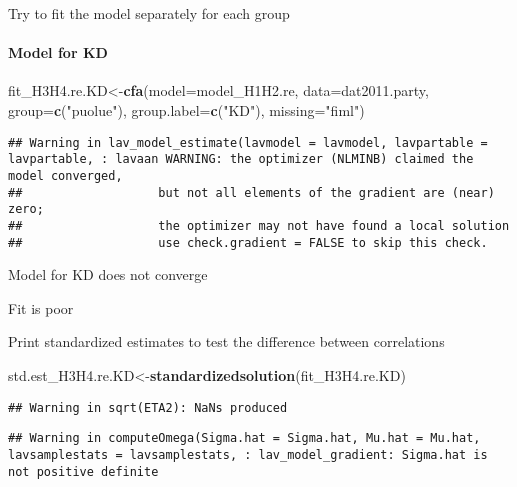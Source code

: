 \documentclass[
]{article}
\newenvironment{Shaded}{\begin{snugshade}}{\end{snugshade}}
\newcommand{\DataTypeTok}[1]{\textcolor[rgb]{0.13,0.29,0.53}{#1}}
\newcommand{\KeywordTok}[1]{\textcolor[rgb]{0.13,0.29,0.53}{\textbf{#1}}}
\newcommand{\NormalTok}[1]{#1}
\newcommand{\StringTok}[1]{\textcolor[rgb]{0.31,0.60,0.02}{#1}}
\begin{document}
Try to fit the model separately for each group

\newpage

\hypertarget{model-for-kd}{%
\paragraph{Model for KD}\label{model-for-kd}}

\begin{Shaded}
\begin{Highlighting}[]
\NormalTok{fit_H3H4.re.KD<-}\KeywordTok{cfa}\NormalTok{(}\DataTypeTok{model=}\NormalTok{model_H1H2.re,}
                    \DataTypeTok{data=}\NormalTok{dat2011.party,}
                    \DataTypeTok{group=}\KeywordTok{c}\NormalTok{(}\StringTok{"puolue"}\NormalTok{),}
                    \DataTypeTok{group.label=}\KeywordTok{c}\NormalTok{(}\StringTok{"KD"}\NormalTok{),}
                    \DataTypeTok{missing=}\StringTok{"fiml"}\NormalTok{)}
\end{Highlighting}
\end{Shaded}

\begin{verbatim}
## Warning in lav_model_estimate(lavmodel = lavmodel, lavpartable = lavpartable, : lavaan WARNING: the optimizer (NLMINB) claimed the model converged,
##                   but not all elements of the gradient are (near) zero;
##                   the optimizer may not have found a local solution
##                   use check.gradient = FALSE to skip this check.
\end{verbatim}

Model for KD does not converge

Fit is poor

Print standardized estimates to test the difference between correlations

\begin{Shaded}
\begin{Highlighting}[]
\NormalTok{std.est_H3H4.re.KD<-}\KeywordTok{standardizedsolution}\NormalTok{(fit_H3H4.re.KD)}
\end{Highlighting}
\end{Shaded}

\begin{verbatim}
## Warning in sqrt(ETA2): NaNs produced
\end{verbatim}

\begin{verbatim}
## Warning in computeOmega(Sigma.hat = Sigma.hat, Mu.hat = Mu.hat, lavsamplestats = lavsamplestats, : lav_model_gradient: Sigma.hat is not positive definite
\end{verbatim}
\end{document}
